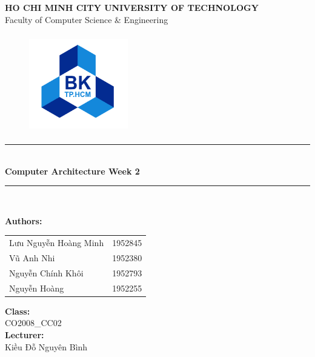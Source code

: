 \documentclass[12pt,a4paper]{article}
\newcommand\HRule{\rule{12cm}{1pt}}
\begin{document}
\begin{titlepage}

  \begin{center}

    \textbf{\fontsize{12pt}{1pt}\selectfont HO CHI MINH CITY UNIVERSITY OF TECHNOLOGY}\\[0.5cm]
    {\fontsize{13pt}{1pt}\selectfont Faculty of Computer Science \& Engineering}\\[0.5cm]
    \begin{figure}[H]
      \centering
      \includegraphics[width=1.7in,height=1.7in]{BK.png}
    \end{figure}

    \HRule\\[0.5cm]
    { \textbf{\fontsize{25pt}{1pt}\selectfont Computer Architecture Week 2}}\\[0.4cm]

    \HRule\\[0.8cm]
    \begin{minipage}{0.545\textwidth}
      \begin{flushleft}
        \textbf{Authors:}\\
        \begin{tabular}{l l}
          Lưu Nguyễn Hoàng Minh & 1952845 \\
          Vũ Anh Nhi            & 1952380 \\
          Nguyễn Chính Khôi     & 1952793 \\
          Nguyễn Hoàng          & 1952255 \\
        \end{tabular}
      \end{flushleft}
    \end{minipage}
    \begin{minipage}{0.4\textwidth}
      \begin{flushright}
        \textbf{Class:}\\
        CO2008\_CC02\\
        \textbf{Lecturer:}\\
        Kiều Đỗ Nguyên Bình\\


\end{flushright}
\end{minipage}
\end{center}
\end{titlepage}
\end{document}
